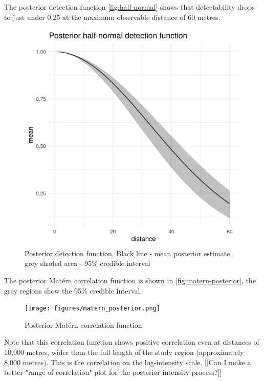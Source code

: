 \documentclass[preprint,12pt]{elsarticle}
\begin{document}
The posterior detection function \autoref{fig:half-normal} shows that detectability drops to just under 0.25 at the maximum observable distance of 60 metres.
\begin{figure}[h]
	\includegraphics[scale=0.5]{figures/halfnormal.png}
	\caption{Posterior detection function.  Black line - mean posterior estimate, grey shaded area - 95\% credible interval}
	\label{fig:half-normal}
\end{figure}

The posterior Mat\'ern correlation function is shown in \autoref{fig:matern-posterior}, the grey regions show the 95\% credible interval. 
\begin{figure}[h]
	\texttt{[image: figures/matern\_posterior.png]}
	\caption{Posterior Mat\'ern correlation function}
	\label{fig:matern-posterior}
\end{figure}
Note that this correlation function shows positive correlation even at distances of 10,000 metres, wider than the full length of the study region (approximately 8,000 metres).  This is the correlation on the log-intensity scale.  [[Can I make a better "range of correlation" plot for the posterior intensity process?]]
\end{document}
